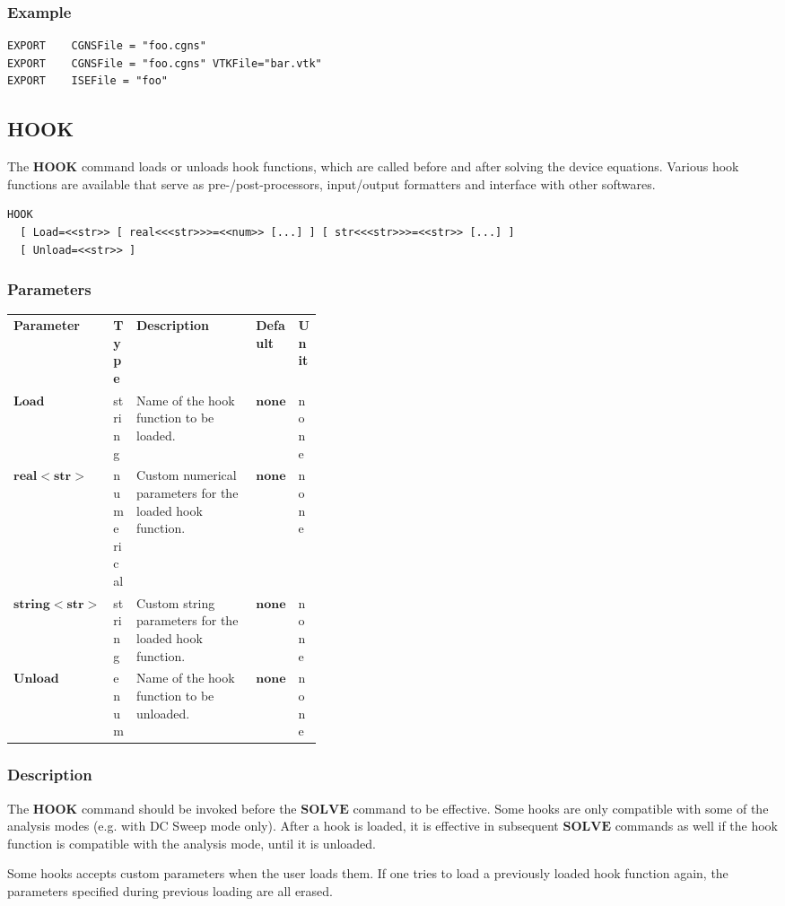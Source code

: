 \documentclass[oneside,12pt]{cgd_book}
\begin{document}
\subsubsection{Example}
\begin{lstlisting}[style=GeniusCode]
EXPORT    CGNSFile = "foo.cgns"
EXPORT    CGNSFile = "foo.cgns" VTKFile="bar.vtk"
EXPORT    ISEFile = "foo"
\end{lstlisting}
\par
\subsection{HOOK}
The $\mathbf{HOOK}$
command loads or unloads hook functions, which are called before and
        after solving the device equations. Various hook functions are available that serve as pre-/post-processors,
        input/output formatters and interface with other softwares.
\par
\begin{lstlisting}[style=GeniusCmd]
HOOK
  [ Load=<<str>> [ real<<<str>>>=<<num>> [...] ] [ str<<<str>>>=<<str>> [...] ]
  [ Unload=<<str>> ]
\end{lstlisting}
\subsubsection{Parameters}
\begin{longtable}{ll>{\raggedright}p{0.4\linewidth}ll}
\textbf{Parameter} & \textbf{Type} & \textbf{Description} & \textbf{Default} & \textbf{Unit} \\
 $\mathbf{Load}$
& string
& Name of the hook function to be loaded.
& $\mathbf{none}$
& none
\\
 $\mathbf{real<str>}$
& numerical
& Custom numerical parameters for the loaded hook function.
& $\mathbf{none}$
& none
\\
 $\mathbf{string<str>}$
& string
& Custom string parameters for the loaded hook function.
& $\mathbf{none}$
& none
\\
 $\mathbf{Unload}$
& enum
& Name of the hook function to be unloaded.
\par
& $\mathbf{none}$
& none\\
\end{longtable}

\par
\subsubsection{Description}
The $\mathbf{HOOK}$ command should be invoked before the $\mathbf{SOLVE}$
command to be
          effective. Some hooks are only compatible with some of the analysis modes (e.g. with DC Sweep mode only).
          After a hook is loaded, it is effective in subsequent
$\mathbf{SOLVE}$ commands as well if the hook
          function is compatible with the analysis mode, until it is unloaded.
\par
Some hooks accepts custom parameters when the user loads them. If one tries to load a previously loaded
          hook function again, the parameters specified during previous loading are all erased.
\par
\end{document}
